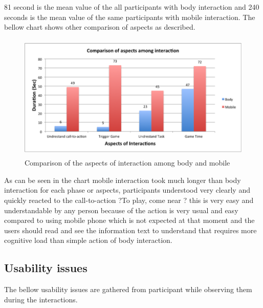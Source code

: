 81 second is the mean value of the all participants with body interaction and 240 seconds is the mean value of the same participants with mobile interaction. The bellow chart shows other comparison of aspects as described.

\begin{figure}[H]
\centering
\includegraphics[width=12cm,height=6cm]{Figures/6/mobile_body_aspect}%
 \caption{Comparison of the aspects of interaction among body and mobile }%
 \label{fig:mobile_body_aspect}%
\end{figure}

As can be seen in the chart mobile interaction took much longer than body interaction for each phase or aspects, participants understood very clearly and quickly reacted to the call-to-action ?To play, come near ? this is very easy and understandable by any person because of the action is very usual and easy compared to using mobile phone which is not expected at that moment and the users should read and see the information text to understand that requires more cognitive load than simple action of body interaction.



\subsection{Usability issues}
The bellow usability issues are gathered from participant while observing them during the interactions.
